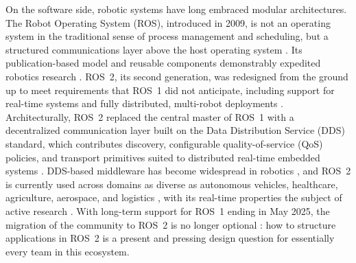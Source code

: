 On the software side, robotic systems have long embraced modular
architectures. The Robot Operating System (ROS), introduced in 2009, is not
an operating system in the traditional sense of process management and
scheduling, but a structured communications layer above the host operating
system \cite{quigley2009}. Its publication-based model and reusable
components demonstrably expedited robotics research \cite{macenski2022}.
ROS~2, its second generation, was redesigned from the ground up to meet
requirements that ROS~1 did not anticipate, including support for real-time
systems and fully distributed, multi-robot deployments
\cite{macenski2022, portugal2025}. Architecturally, ROS~2 replaced the
central master of ROS~1 with a decentralized communication layer built on
the Data Distribution Service (DDS) standard, which contributes discovery,
configurable quality-of-service (QoS) policies, and transport primitives
suited to distributed real-time embedded systems
\cite{macenski2022, maruyama2016, gambo2025}. DDS-based middleware has
become widespread in robotics \cite{gambo2025}, and ROS~2 is currently used
across domains as diverse as autonomous vehicles, healthcare, agriculture,
aerospace, and logistics \cite{al-batati2026}, with its real-time
properties the subject of active research \cite{casini2026}. With
long-term support for ROS~1 ending in May 2025, the migration of the
community to ROS~2 is no longer optional \cite{portugal2025}: how to
structure applications in ROS~2 is a present and pressing design question
for essentially every team in this ecosystem.

